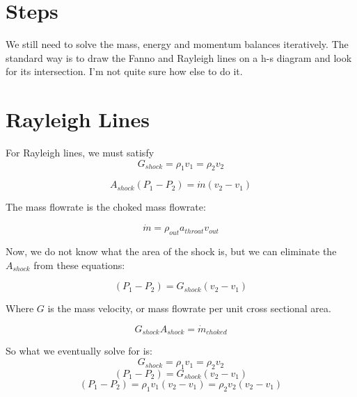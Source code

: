 \documentclass[masters]{ucbthesis}
\renewcommand{\_}{\kern-1.5pt\textunderscore\kern-1.5pt}
\begin{document}
\section{Steps}

We still need to solve the mass, energy and momentum balances iteratively.
The standard way is to draw the Fanno and Rayleigh lines on a h-s diagram 
and look for its intersection. I'm not quite sure how else to do it.


\section{Rayleigh Lines}

For Rayleigh lines, we must satisfy
\begin{equation*}
	G_{shock} = \rho_1 v_1 = \rho_2 v_2 
\end{equation*}

\begin{equation*}
	A_{shock}(P_1 -P_2) = \dot{m} (v_2 - v_1)
\end{equation*}

The mass flowrate is the choked mass flowrate:

\begin{equation*}
	\dot{m} = \rho_{out} a_{throat} v_{out}
\end{equation*}

Now, we do not know what the area of the shock is, but we can eliminate 
the $A_{shock}$ from these equations:


\begin{equation*}
	(P_1 -P_2) = G_{shock} (v_2 - v_1)
\end{equation*}

Where $G$ is the mass velocity, or mass flowrate per unit cross sectional 
area.

\begin{equation*}
	G_{shock} A_{shock} = \dot{m}_{choked}
\end{equation*}

So what we eventually solve for is:
\begin{equation*}
	G_{shock} = \rho_1 v_1 = \rho_2 v_2 
\end{equation*}
\begin{equation*}
	(P_1 -P_2) = G_{shock} (v_2 - v_1)
\end{equation*}
\begin{equation*}
	(P_1 -P_2) = \rho_1 v_1 (v_2 - v_1) = \rho_2 v_2 (v_2 - v_1)
\end{equation*}
\end{document}
